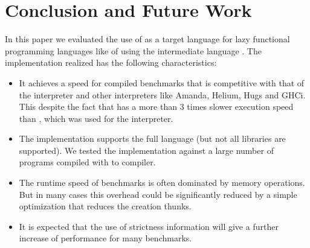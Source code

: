 \section{Conclusion and Future Work}\label{sapljs:sec:conclusions}
In this paper we evaluated the use of \JS as a target language for lazy functional programming languages like \Haskell of \Clean using the intermediate language \Sapl.
The implementation realized has the following characteristics:

\begin{itemize}
\item It achieves a speed for compiled benchmarks 
that is competitive with that of the  \Sapl interpreter and other interpreters like \textsf{Amanda}, 
\textsf{Helium}, \textsf{Hugs} and \textsf{GHCi}.
This despite the fact that \JS has a more than 3 times slower execution speed than \Java, which was used for the \Sapl interpreter.
\item The implementation supports the full \Clean language (but not all libraries are supported).
We tested the implementation against a large number of \Clean programs compiled with \Clean to \Sapl compiler. 
\item The runtime speed of benchmarks is often dominated by memory operations. 
But in many cases this overhead could be significantly reduced by a simple optimization
that reduces the creation thunks.
\item It is expected that the use of strictness information will give a further increase of performance
for many benchmarks.
\end{itemize}

